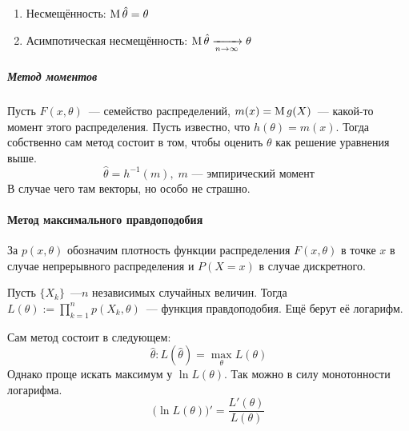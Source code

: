 \documentclass[12pt,timbord]{../../../notes}
\begin{document}
\subparagraph{}

\begin{enumerate}
  \item Несмещённость: $\operatorname{M} \hat\theta = \theta$
  \item Асимпотическая несмещённость: $\operatorname{M} \hat\theta \xrightarrow[n\to \infty]{} \theta$
\end{enumerate}

\subparagraph{Метод моментов}

\begin{defn}\label{defn:stat:mom:method}

  Пусть $F(x,\theta)$~--- семейство распределений, $m(x) = \operatorname{M} g(X)$~--- какой-то момент этого
  распределения. Пусть известно, что $h(\theta) = m(x)$. Тогда собственно сам метод состоит в том,
  чтобы оценить $\theta$ как решение уравнения выше.
  \[
    \hat \theta = h^{-1} (m), \; m\text{~--- эмпирический момент}
  \]
  В случае чего там векторы, но особо не страшно.

\end{defn}

\begin{exmp}\label{exmp:stat::mom::norm}
\end{exmp}

\paragraph{Метод максимального правдоподобия}
\label{par:stat::maklike}

\begin{defn}\label{defn:stat::maxlike::dens}
  За $p(x,\theta) $ обозначим плотность функции распределения $F(x,\theta)$ в точке $x$ в случае
  непрерывного распределения и $P(X=x)$ в случае дискретного.
\end{defn}
\begin{defn}\label{defn:stat::maxlike::fun}
  Пусть $\{X_k\}$~---$n$ независимых случайных величин. Тогда
  $\displaystyle L(\theta):= \prod_{k=1}^n p(X_k, \theta)$~--- функция правдоподобия.
  Ещё берут её логарифм.
\end{defn}

\begin{defn}\label{defn:stat::maxlike::method}
  Сам метод состоит в следующем:
  \[
    \hat \theta \colon L(\hat \theta) = \max_\theta L (\theta)
  \]
  Однако проще искать максимум у $\ln L(\theta)$. Так можно в силу монотонности логарифма.
  \[
    \bigl( \ln L (\theta)\bigr)' = \frac{L'(\theta)}{L(\theta)} 
  \]
\end{defn}
\end{document}
